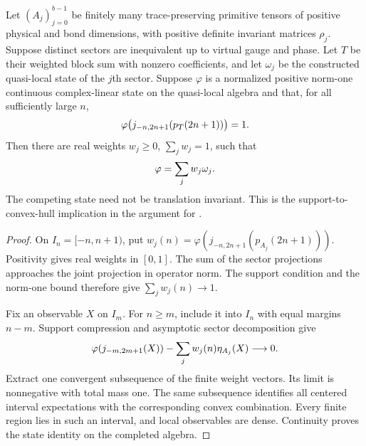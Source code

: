 \begin{lemma}
    \label{thm:multiblock_supported_quasi_local_state_convex_combination}
    \leanok
    Let $(A_j)_{j=0}^{b-1}$ be finitely many trace-preserving primitive tensors
    of positive physical and bond dimensions, with positive definite invariant matrices $\rho_j$. Suppose distinct sectors are
    inequivalent up to virtual gauge and phase. Let $T$ be their weighted
    block sum with nonzero coefficients, and let $\omega_j$ be the
    constructed quasi-local state of the $j$th sector.
    Suppose $\varphi$ is a normalized positive norm-one continuous
    complex-linear state on the quasi-local algebra and that, for all
    sufficiently large $n$,
    \begin{align}
        \varphi\bigl(j_{-n,2n+1}(p_T(2n+1))\bigr)=1.
        \notag
    \end{align}
    Then there are real weights $w_j\geq0$, $\sum_jw_j=1$, such that
    \begin{align}
        \varphi=\sum_jw_j\omega_j.
        \notag
    \end{align}
    The competing state need not be translation invariant. This is the
    support-to-convex-hull implication in the argument for
    \cite[Theorem~1.1]{Nachtergaele1996Spectral}.
\end{lemma}
\begin{proof}\leanok
    On $I_n=[-n,n+1)$, put
    $w_j(n)=\varphi(j_{-n,2n+1}(p_{A_j}(2n+1)))$.
    Positivity gives real weights in $[0,1]$. The sum of the sector
    projections approaches the joint projection in operator norm.
    The support condition and the norm-one bound therefore give
    $\sum_jw_j(n)\to1$.

    Fix an observable $X$ on $I_m$. For $n\geq m$, include it into $I_n$
    with equal margins $n-m$. Support compression and asymptotic sector
    decomposition give
    \begin{align}
        \varphi(j_{-m,2m+1}(X))-
        \sum_jw_j(n)\eta_{A_j}(X)\longrightarrow0.
        \notag
    \end{align}
    Extract one convergent subsequence of the finite weight vectors.
    Its limit is nonnegative with total mass one. The same subsequence
    identifies all centered interval expectations with the corresponding
    convex combination. Every finite region lies in such an interval,
    and local observables are dense. Continuity proves the state identity
    on the completed algebra.
\end{proof}

